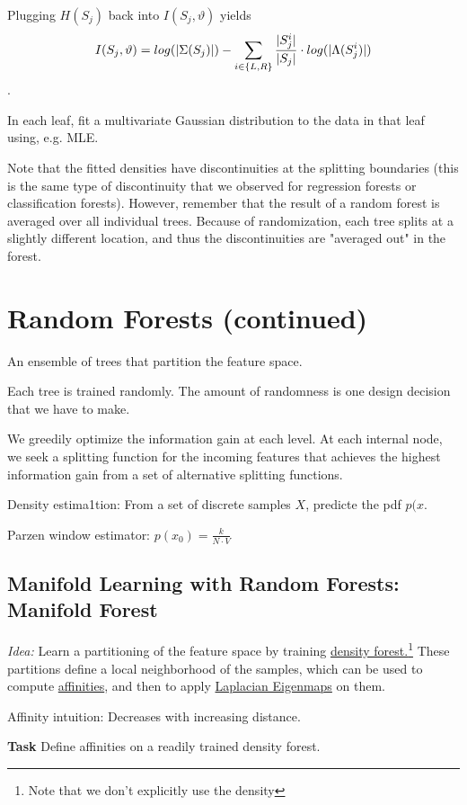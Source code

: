 \documentclass{scrartcl}
\DeclarePairedDelimiter\abs{\lvert}{\rvert}%
\begin{document}
Plugging \(H(S_j)\) back into \(I(S_j, \vartheta)\) yields
\[I(S_j, \vartheta) = log (\abs{\Sigma(S_j)}) - \sum_{i \in \{L, R\}} \frac{\abs{S_j^i}}{\abs{S_j}} \cdot log(\abs{\Lambda(S_j^i)})\].

In each leaf, fit a multivariate Gaussian distribution to the data in that leaf using, e.g. MLE.

Note that the fitted densities have discontinuities at the splitting boundaries (this is the same type of discontinuity that we observed for regression forests or classification forests). However, remember that the result of a random forest is averaged over all individual trees. Because of randomization, each tree splits at a slightly different location, and thus the discontinuities are "averaged out" in the forest.

\section{Random Forests (continued)}
An ensemble of trees that partition the feature space.

Each tree is trained randomly. The amount of randomness is one design decision that we have to make. 

We greedily optimize the information gain at each level. At each internal node, we seek a splitting function for the incoming features that achieves the highest information gain from a set of alternative splitting functions.

\bigbreak

Density estima1tion: From a set of discrete samples \(X\), predicte the pdf \(p(x\).

Parzen window estimator: \(p(x_0) = \frac{k}{N \cdot V}\)

\subsection{Manifold Learning with Random Forests: Manifold Forest}
\textit{Idea:} Learn a partitioning of the feature space by training \underline{density forest.}\footnote{Note that we don't explicitly use the density} These partitions define a local neighborhood of the samples, which can be used to compute \underline{affinities}, and then to apply \underline{Laplacian Eigenmaps} on them.

Affinity intuition: Decreases with increasing distance.

\bigbreak

\textbf{Task} Define affinities on a readily trained density forest.
\end{document}
